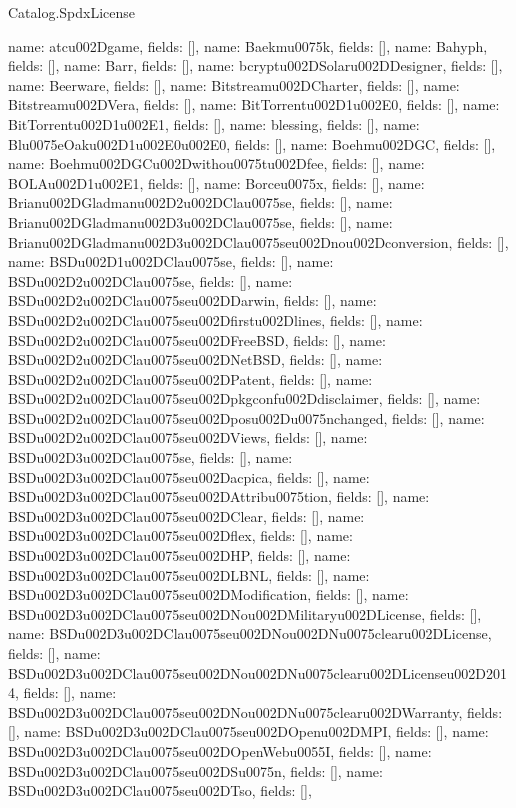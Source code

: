 \begin{lexlean}{Catalog.SpdxLicense}
\begin{semanticmodule}
{    {name: atcu002Dgame, fields: []},
    {name: Baekmu0075k, fields: []},
    {name: Bahyph, fields: []},
    {name: Barr, fields: []},
    {name: bcryptu002DSolaru002DDesigner, fields: []},
    {name: Beerware, fields: []},
    {name: Bitstreamu002DCharter, fields: []},
    {name: Bitstreamu002DVera, fields: []},
    {name: BitTorrentu002D1u002E0, fields: []},
    {name: BitTorrentu002D1u002E1, fields: []},
    {name: blessing, fields: []},
    {name: Blu0075eOaku002D1u002E0u002E0, fields: []},
    {name: Boehmu002DGC, fields: []},
    {name: Boehmu002DGCu002Dwithou0075tu002Dfee, fields: []},
    {name: BOLAu002D1u002E1, fields: []},
    {name: Borceu0075x, fields: []},
    {name: Brianu002DGladmanu002D2u002DClau0075se, fields: []},
    {name: Brianu002DGladmanu002D3u002DClau0075se, fields: []},
    {name: Brianu002DGladmanu002D3u002DClau0075seu002Dnou002Dconversion, fields: []},
    {name: BSDu002D1u002DClau0075se, fields: []},
    {name: BSDu002D2u002DClau0075se, fields: []},
    {name: BSDu002D2u002DClau0075seu002DDarwin, fields: []},
    {name: BSDu002D2u002DClau0075seu002Dfirstu002Dlines, fields: []},
    {name: BSDu002D2u002DClau0075seu002DFreeBSD, fields: []},
    {name: BSDu002D2u002DClau0075seu002DNetBSD, fields: []},
    {name: BSDu002D2u002DClau0075seu002DPatent, fields: []},
    {name: BSDu002D2u002DClau0075seu002Dpkgconfu002Ddisclaimer, fields: []},
    {name: BSDu002D2u002DClau0075seu002Dposu002Du0075nchanged, fields: []},
    {name: BSDu002D2u002DClau0075seu002DViews, fields: []},
    {name: BSDu002D3u002DClau0075se, fields: []},
    {name: BSDu002D3u002DClau0075seu002Dacpica, fields: []},
    {name: BSDu002D3u002DClau0075seu002DAttribu0075tion, fields: []},
    {name: BSDu002D3u002DClau0075seu002DClear, fields: []},
    {name: BSDu002D3u002DClau0075seu002Dflex, fields: []},
    {name: BSDu002D3u002DClau0075seu002DHP, fields: []},
    {name: BSDu002D3u002DClau0075seu002DLBNL, fields: []},
    {name: BSDu002D3u002DClau0075seu002DModification, fields: []},
    {name: BSDu002D3u002DClau0075seu002DNou002DMilitaryu002DLicense, fields: []},
    {name: BSDu002D3u002DClau0075seu002DNou002DNu0075clearu002DLicense, fields: []},
    {name: BSDu002D3u002DClau0075seu002DNou002DNu0075clearu002DLicenseu002D2014, fields: []},
    {name: BSDu002D3u002DClau0075seu002DNou002DNu0075clearu002DWarranty, fields: []},
    {name: BSDu002D3u002DClau0075seu002DOpenu002DMPI, fields: []},
    {name: BSDu002D3u002DClau0075seu002DOpenWebu0055I, fields: []},
    {name: BSDu002D3u002DClau0075seu002DSu0075n, fields: []},
    {name: BSDu002D3u002DClau0075seu002DTso, fields: []},
}
\end{semanticmodule}
\end{lexlean}
